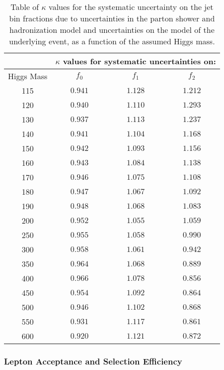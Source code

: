\begin{table}[!htbp]
\begin{center}
\begin{tabular}{|c|c|c|c|}

\hline
               &   \multicolumn{3}{|c|}{ $\kappa$ values for systematic uncertainties on: } \\
\hline
Higgs Mass     &   $f_{0}$   &  $f_{1}$       &   $f_{2}$       \\
\hline
115 & $0.941$ & $1.128$ & $1.212$ \\
120 & $0.940$ & $1.110$ & $1.293$ \\
130 & $0.937$ & $1.113$ & $1.237$ \\
140 & $0.941$ & $1.104$ & $1.168$ \\
150 & $0.942$ & $1.093$ & $1.156$ \\
160 & $0.943$ & $1.084$ & $1.138$ \\
170 & $0.946$ & $1.075$ & $1.108$ \\
180 & $0.947$ & $1.067$ & $1.092$ \\
190 & $0.948$ & $1.068$ & $1.083$ \\
200 & $0.952$ & $1.055$ & $1.059$ \\
250 & $0.955$ & $1.058$ & $0.990$ \\
300 & $0.958$ & $1.061$ & $0.942$ \\
350 & $0.964$ & $1.068$ & $0.889$ \\
400 & $0.966$ & $1.078$ & $0.856$ \\
450 & $0.954$ & $1.092$ & $0.864$ \\
500 & $0.946$ & $1.102$ & $0.868$ \\
550 & $0.931$ & $1.117$ & $0.861$ \\
600 & $0.920$ & $1.121$ & $0.872$ \\
\hline
\end{tabular}
\caption{Table of $\kappa$ values for the systematic uncertainty on the jet bin fractions
due to  uncertainties in the parton shower and hadronization model and uncertainties
on the model of the underlying event, as a function of the assumed Higgs mass.  }
\label{tab:JetBinFractionSystematics_PartonShower}
\end{center}
\end{table}



\subsubsection{Lepton Acceptance and Selection Efficiency }

